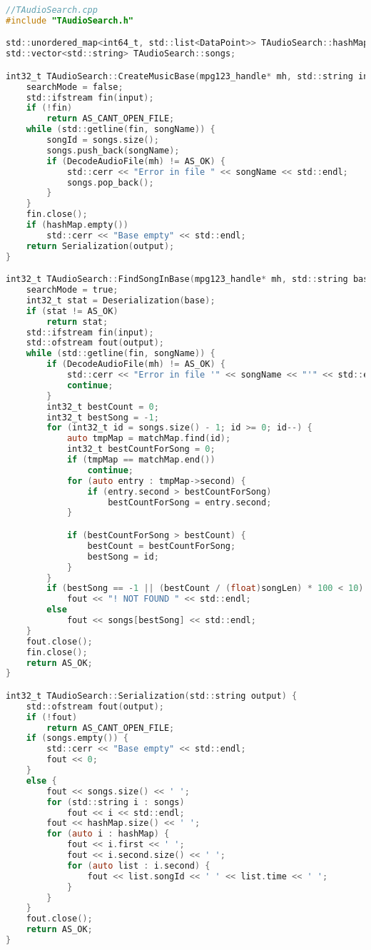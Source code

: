 \begin{lstlisting}[language=C, mathescape]
//TAudioSearch.cpp
#include "TAudioSearch.h"

std::unordered_map<int64_t, std::list<DataPoint>> TAudioSearch::hashMap;
std::vector<std::string> TAudioSearch::songs;

int32_t TAudioSearch::CreateMusicBase(mpg123_handle* mh, std::string input, std::string output) {
    searchMode = false;
    std::ifstream fin(input);
    if (!fin)
        return AS_CANT_OPEN_FILE;
    while (std::getline(fin, songName)) {
        songId = songs.size();
        songs.push_back(songName);
        if (DecodeAudioFile(mh) != AS_OK) {
            std::cerr << "Error in file " << songName << std::endl;
            songs.pop_back();
        }
    }
    fin.close();
    if (hashMap.empty())
        std::cerr << "Base empty" << std::endl;
    return Serialization(output);
}

int32_t TAudioSearch::FindSongInBase(mpg123_handle* mh, std::string base, std::string input, std::string output) {
    searchMode = true;
    int32_t stat = Deserialization(base);
    if (stat != AS_OK)
        return stat;
    std::ifstream fin(input);
    std::ofstream fout(output);
    while (std::getline(fin, songName)) {
        if (DecodeAudioFile(mh) != AS_OK) {
            std::cerr << "Error in file '" << songName << "'" << std::endl;
            continue;
        }
        int32_t bestCount = 0;
        int32_t bestSong = -1;
        for (int32_t id = songs.size() - 1; id >= 0; id--) {
            auto tmpMap = matchMap.find(id);
            int32_t bestCountForSong = 0;
            if (tmpMap == matchMap.end())
                continue;
            for (auto entry : tmpMap->second) {
                if (entry.second > bestCountForSong)
                    bestCountForSong = entry.second;
            }

            if (bestCountForSong > bestCount) {
                bestCount = bestCountForSong;
                bestSong = id;
            }
        }
        if (bestSong == -1 || (bestCount / (float)songLen) * 100 < 10)
            fout << "! NOT FOUND " << std::endl;
        else
            fout << songs[bestSong] << std::endl;
    }
    fout.close();
    fin.close();
    return AS_OK;
}

int32_t TAudioSearch::Serialization(std::string output) {
    std::ofstream fout(output);
    if (!fout)
        return AS_CANT_OPEN_FILE;
    if (songs.empty()) {
        std::cerr << "Base empty" << std::endl;
        fout << 0;
    }
    else {
        fout << songs.size() << ' ';
        for (std::string i : songs)
            fout << i << std::endl;
        fout << hashMap.size() << ' ';
        for (auto i : hashMap) {
            fout << i.first << ' ';
            fout << i.second.size() << ' ';
            for (auto list : i.second) {
                fout << list.songId << ' ' << list.time << ' ';
            }
        }
    }
    fout.close();
    return AS_OK;
}


\end{lstlisting}
